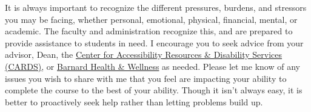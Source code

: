 \documentclass[
  letterpaper,
  DIV=11,
  numbers=noendperiod]{scrartcl}
\begin{document}
It is always important to recognize the different pressures, burdens,
and stressors you may be facing, whether personal, emotional, physical,
financial, mental, or academic. The faculty and administration recognize
this, and are prepared to provide assistance to students in need. I
encourage you to seek advice from your advisor, Dean, the
\href{https://barnard.edu/disability-services}{Center for Accessibility
Resources \& Disability Services (CARDS)}, or
\href{https://barnard.edu/health-wellness}{Barnard Health \& Wellness}
as needed. Please let me know of any issues you wish to share with me
that you feel are impacting your ability to complete the course to the
best of your ability. Though it isn't always easy, it is better to
proactively seek help rather than letting problems build up.
\end{document}
